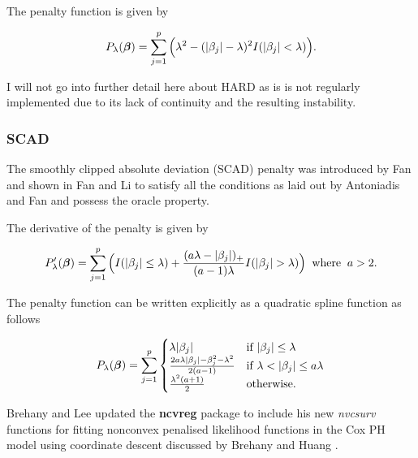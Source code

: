 The penalty function is given by

\begin{equation}
    P_{\lambda}(\boldsymbol{\beta})=\sum_{j=1}^p\Big(\lambda^2 - (|\beta_j|-\lambda)^2I(|\beta_j|<\lambda)\Big).
\end{equation}

I will not go into further detail here about HARD as is is not regularly implemented due to its lack of continuity and the resulting instability.

\subsubsection{SCAD}\label{sec:SCAD}

The smoothly clipped absolute deviation (SCAD) penalty was introduced by Fan  and shown in Fan and Li  to satisfy all the conditions as laid out by Antoniadis and Fan  and possess the oracle property.

The derivative of the penalty is given by

\begin{equation}
    P_\lambda'(\Beta) = \sum_{j=1}^p\Big(I(|\beta_j|\leq\lambda)+\frac{(a\lambda-|\beta_j|)_{+}}{(a-1)\lambda}I(|\beta_j|>\lambda)\Big)\;\;\textrm{where}\;\;a>2.
\end{equation}

The penalty function can be written explicitly as a quadratic spline function as follows

\begin{equation}
    P_\lambda(\Beta)=\sum_{j=1}^p
    \begin{cases}
        \lambda|\beta_j| &\textrm{if }|\beta_j|\leq\lambda\\
        \frac{2a\lambda|\beta_j|-\beta_j^2-\lambda^2}{2(a-1)} &\textrm{if }\lambda<|\beta_j|\leq a\lambda\\
        \frac{\lambda^2(a+1)}{2} &\textrm{otherwise}.
    \end{cases}
\end{equation}


Brehany and Lee  updated the \textbf{ncvreg} package to include his new \emph{nvcsurv} functions for fitting nonconvex penalised likelihood functions in the Cox PH model using coordinate descent discussed by Brehany and Huang .

